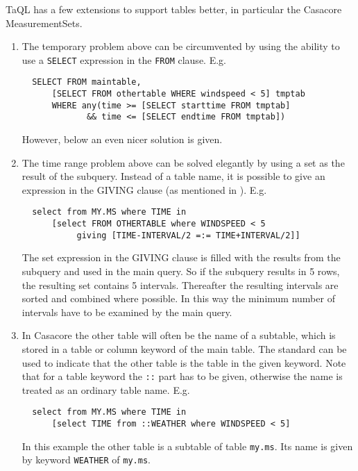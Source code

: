 TaQL has a few extensions to support tables better,
in particular the Casacore MeasurementSets.
\begin{enumerate}
\item
The temporary problem above can be circumvented by using the
ability to use a \texttt{SELECT} expression in the \texttt{FROM}
clause. E.g.
\begin{verbatim}
  SELECT FROM maintable,
      [SELECT FROM othertable WHERE windspeed < 5] tmptab
      WHERE any(time >= [SELECT starttime FROM tmptab]
             && time <= [SELECT endtime FROM tmptab])
\end{verbatim}
However, below an even nicer solution is given. 

\item
The time range problem above can be solved elegantly by using
a set as the result of the subquery. Instead of a table name,
it is possible to give an expression in the GIVING clause (as mentioned
in ). E.g.
\begin{verbatim}
  select from MY.MS where TIME in
      [select FROM OTHERTABLE where WINDSPEED < 5
           giving [TIME-INTERVAL/2 =:= TIME+INTERVAL/2]]
\end{verbatim}
The set expression in the GIVING clause is filled with the
results from the subquery and used in the main query. So if
the subquery results in 5 rows, the resulting set contains 5
intervals. Thereafter the resulting intervals are sorted and combined
where possible. In this way the minimum number of intervals have to be
examined by the main query.

\item
In Casacore the other table will often be the name of a subtable,
which is stored in a table or column keyword of the main table.
The standard  can be used
to indicate that the other table is the table in the given keyword.
Note that for a table keyword the \texttt{::} part has to be given,
otherwise the name is treated as an ordinary table name. E.g.
\begin{verbatim}
  select from MY.MS where TIME in
      [select TIME from ::WEATHER where WINDSPEED < 5]
\end{verbatim}
In this example the other table is a subtable of table \texttt{my.ms}.
Its name is given by keyword \texttt{WEATHER} of \texttt{my.ms}.


\end{enumerate}
